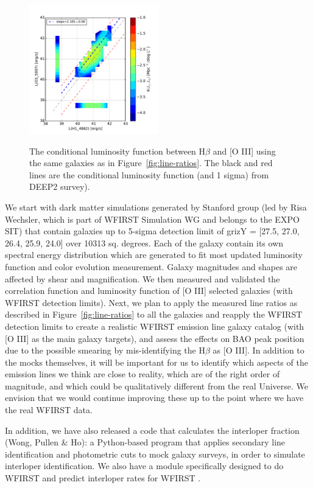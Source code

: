 \begin{figure}
  \includegraphics[width = 0.5\textwidth]{Plots/cond_lum.pdf}
 \label{fig:cond-lum}
  \caption{The conditional luminosity function between H$\beta$ and [O III] using the same galaxies as in Figure~\ref{fig:line-ratios}.  The black and red lines are the conditional luminosity function (and 1 sigma) from DEEP2 survey).
 }
 \end{figure}

 We start with dark matter simulations generated by Stanford group (led by Risa
Wechsler, which is part of WFIRST Simulation WG and belongs to the EXPO SIT)
that contain galaxies up to 5-sigma detection limit of grizY = [27.5, 27.0,
26.4, 25.9, 24.0] over 10313 sq. degrees.  Each of the galaxy contain its own
spectral energy distribution which are generated to fit most updated luminosity
function and color evolution measurement. Galaxy magnitudes and shapes are
affected by shear and magnification. We then measured and validated the
correlation function and luminosity function of [O III] selected galaxies (with
WFIRST detection limits). Next, we plan to apply
the measured line ratios as described in Figure~\ref{fig:line-ratios} to all the
galaxies and reapply the WFIRST detection limits to create a realistic WFIRST
emission line galaxy catalog (with  [O III] as the main galaxy targets), and
assess the effects on BAO peak position due to the possible smearing by
mis-identifying the H$\beta$ as [O III]. In addition to the mocks themselves, it
will be important for us to identify which aspects of the emission lines we
think are close to reality, which are of the right order of magnitude, and which
could be qualitatively different from the real Universe. We envision that we
would continue improving these up to the point where we have the real WFIRST
data.

 In addition, we have also released a code that calculates the interloper
 fraction (Wong, Pullen \& Ho): a Python-based program that applies secondary
 line identification and photometric cuts to mock galaxy surveys, in order to
 simulate interloper identification. We also have a module specifically designed
 to do WFIRST and predict interloper rates for WFIRST \citep{Wong:2016eku}.

